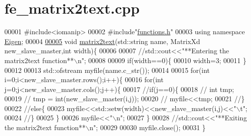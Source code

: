 \hypertarget{fe__matrix2text_8cpp_source}{}\section{fe\+\_\+matrix2text.\+cpp}
\label{fe__matrix2text_8cpp_source}

\begin{DoxyCode}
00001 \textcolor{preprocessor}{#include<iomanip>}
00002 \textcolor{preprocessor}{#include"\hyperlink{functions_8h}{functions.h}"}
00003 \textcolor{keyword}{using namespace }\hyperlink{namespace_eigen}{Eigen};
00004 
\hyperlink{fe__matrix2text_8cpp_a346547477d2a1fbeff6b5e0b05314283}{00005} \textcolor{keywordtype}{void} \hyperlink{fe__matrix2text_8cpp_a346547477d2a1fbeff6b5e0b05314283}{matrix2text}(std::string name, MatrixXd new\_slave\_master,\textcolor{keywordtype}{int} width)\{
00006 
00007     \textcolor{comment}{//std::cout<<"**Entering the matrix2text function**\(\backslash\)n";}
00008 
00009     \textcolor{keywordflow}{if}(width==0)\{
00010         width=3;
00011     \}
00012 
00013     std::ofstream myfile(name.c\_str());
00014 
00015         \textcolor{keywordflow}{for}(\textcolor{keywordtype}{int} i=0;i<new\_slave\_master.rows();i++)\{
00016             \textcolor{keywordflow}{for}(\textcolor{keywordtype}{int} j=0;j<new\_slave\_master.cols();j++)\{
00017                 \textcolor{comment}{//if(j==0)\{}
00018             \textcolor{comment}{//  int tmp;}
00019             \textcolor{comment}{//  tmp = int(new\_slave\_master(i,j));}
00020             \textcolor{comment}{//  myfile<<tmp;}
00021             \textcolor{comment}{//\}}
00022             \textcolor{comment}{//else\{}
00023                 myfile<<std::setw(width)<<new\_slave\_master(i,j)<<\textcolor{stringliteral}{"\(\backslash\)t"};
00024             \textcolor{comment}{//\}}
00025             \}
00026             myfile<<\textcolor{stringliteral}{"\(\backslash\)n"};
00027         \}
00028     \textcolor{comment}{//std::cout<<"**Exiting the matrix2text function**\(\backslash\)n";}
00029 
00030         myfile.close();
00031 \}
\end{DoxyCode}
